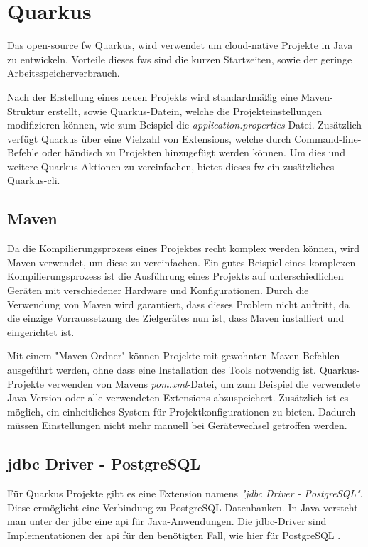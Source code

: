 
\section{Quarkus}
Das open-source \gls{fw} Quarkus, wird verwendet um cloud-native Projekte in Java zu entwickeln. 
Vorteile dieses \glspl{fw} sind die kurzen Startzeiten, sowie der geringe Arbeitsspeicherverbrauch.
\cite{QuarkusHomepage}

Nach der Erstellung eines neuen Projekts wird standardmäßig eine \hyperref[ch::MavenTool]{Maven}-Struktur erstellt, sowie Quarkus-Datein, welche die Projekteinstellungen modifizieren können, wie zum Beispiel die \emph{application.properties}-Datei. 
Zusätzlich verfügt Quarkus über eine Vielzahl von Extensions, welche durch Command-line-Befehle oder händisch zu Projekten hinzugefügt werden können. 
Um dies und weitere Quarkus-Aktionen zu vereinfachen, bietet dieses \gls{fw} ein zusätzliches Quarkus-\gls{cli}.
\cite{QuarkusAbout, QuarkusFirstApplication}


\subsection{Maven}
\label{ch::MavenTool}
Da die Kompilierungsprozess eines Projektes recht komplex werden können, wird Maven verwendet, um diese zu vereinfachen.
Ein gutes Beispiel eines komplexen Kompilierungsprozess ist die Ausführung eines Projekts auf unterschiedlichen Geräten mit verschiedener Hardware und Konfigurationen.
Durch die Verwendung von Maven wird garantiert, dass dieses Problem nicht auftritt, da die einzige Vorraussetzung des Zielgerätes nun ist, dass Maven installiert und eingerichtet ist.

Mit einem "Maven-Ordner" können Projekte mit gewohnten Maven-Befehlen ausgeführt werden, ohne dass eine Installation des Tools notwendig ist.
Quarkus-Projekte verwenden von Mavens \emph{pom.xml}-Datei, um zum Beispiel die verwendete Java Version oder alle verwendeten Extensions abzuspeichert.
Zusätzlich ist es möglich, ein einheitliches System für Projektkonfigurationen zu bieten.
Dadurch müssen Einstellungen nicht mehr manuell bei Gerätewechsel getroffen werden. 
\cite{MavenAbout}


\subsection{\gls*{jdbc} Driver - PostgreSQL}
Für Quarkus Projekte gibt es eine Extension namens \textit{"\gls{jdbc} Driver - PostgreSQL"}.
Diese ermöglicht eine Verbindung zu PostgreSQL-Datenbanken. 
In Java versteht man unter der \gls{jdbc} eine \gls{api} für Java-Anwendungen. 
Die \gls{jdbc}-Driver sind Implementationen der \gls{api} für den benötigten Fall, wie hier für PostgreSQL \cite{StackOFJDBC}.


